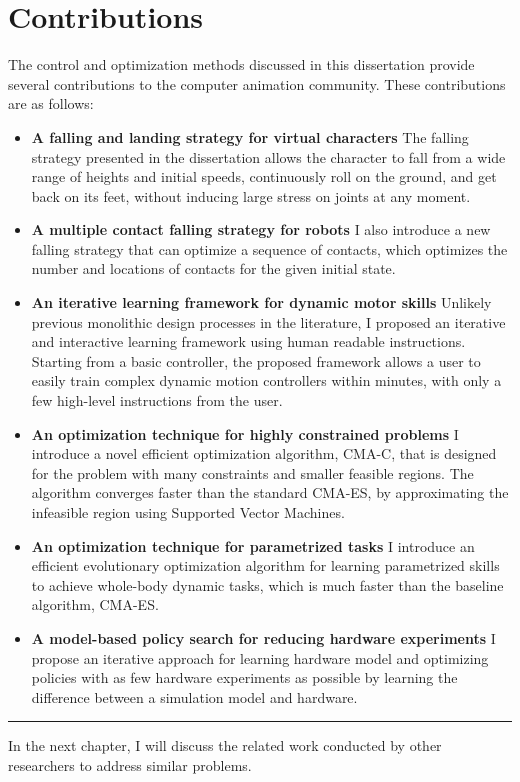 \section{Contributions}
The control and optimization methods discussed in this dissertation provide
several contributions to the computer animation community. 
These contributions are as follows:


\begin{itemize}
\item \textbf{A falling and landing strategy for virtual characters}
  The falling strategy presented in the dissertation allows the character to
  fall from a wide range of heights and initial speeds, continuously roll 
  on the ground, and get back on its feet, without inducing large stress on
  joints at any moment.
\item \textbf{A multiple contact falling strategy for robots}
  I also introduce a new falling strategy that can optimize a sequence
  of contacts, which optimizes the number and locations of contacts
  for the given initial state.
\item \textbf{An iterative learning framework for dynamic motor skills}
  Unlikely previous monolithic design processes in the literature,
  I proposed an iterative and interactive learning framework 
  using human readable instructions.
  Starting from a basic controller, the proposed framework allows a user 
  to easily train complex dynamic motion controllers within minutes,
  with only a few high-level instructions from the user.
\item \textbf{An optimization technique for highly constrained problems}
  I introduce a novel efficient optimization algorithm, CMA-C, that is 
  designed for the problem with many constraints and smaller feasible regions.
  The algorithm converges faster than the standard CMA-ES,
  by approximating the infeasible region using
  Supported Vector Machines.
\item \textbf{An optimization technique for parametrized tasks}
  I introduce an efficient evolutionary optimization algorithm for learning
  parametrized skills to achieve whole-body dynamic tasks, which is much
  faster than the baseline algorithm, CMA-ES.
\item \textbf{A model-based policy search for reducing hardware experiments}
  I propose an iterative approach for learning hardware model and optimizing
  policies with as few hardware experiments as possible by learning the
  difference between a simulation model and hardware.
\end{itemize}

\rule{\textwidth}{1pt}

In the next chapter, I will discuss the related work conducted by other
researchers to address similar problems.
